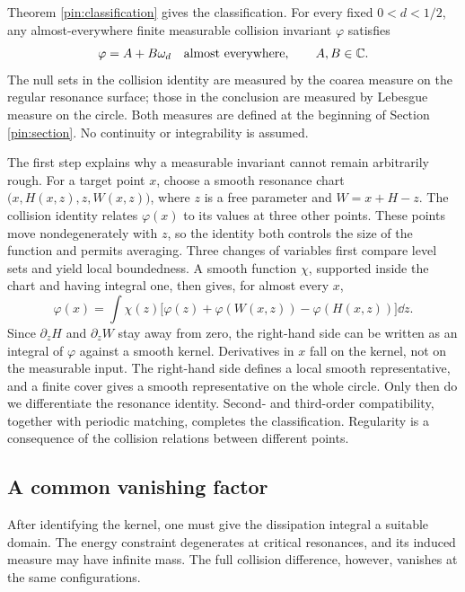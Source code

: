 Theorem \ref{pin:classification} gives the classification. For every fixed
$0<d<1/2$, any almost-everywhere finite measurable collision invariant
$\varphi$ satisfies
\begin{equation}\label{intro:classification}
 \varphi=A+B\omega_d\quad\text{almost everywhere},\qquad A,B\in\mathbb C.
\end{equation}
The null sets in the collision identity are measured by the coarea measure
on the regular resonance surface; those in the conclusion are measured by
Lebesgue measure on the circle. Both measures are defined at the beginning
of Section \ref{pin:section}. No continuity or integrability is assumed.

The first step explains why a measurable invariant cannot remain arbitrarily
rough. For a target point $x$, choose a smooth resonance chart
$\bigl(x,H(x,z),z,W(x,z)\bigr)$, where $z$ is a free parameter and
$W=x+H-z$. The collision identity relates $\varphi(x)$ to its values at
three other points. These points move nondegenerately with $z$, so the
identity both controls the size of the function and permits averaging.
Three changes of variables first compare level sets and yield local
boundedness. A smooth function $\chi$, supported inside the chart and
having integral one, then gives, for almost every $x$,
\begin{equation}\label{intro:resonant-average}
 \varphi(x)=\int\chi(z)
 \bigl[\varphi(z)+\varphi(W(x,z))-\varphi(H(x,z))\bigr]\dd z.
\end{equation}
Since $\partial_zH$ and $\partial_zW$ stay away from zero, the right-hand side
can be written as an integral of $\varphi$ against a smooth kernel.
Derivatives in $x$ fall on the kernel, not on the measurable input.
The right-hand side defines a local smooth representative, and a finite
cover gives a smooth representative on the whole circle. Only then do we
differentiate the resonance identity. Second- and third-order compatibility,
together with periodic matching, completes the classification.
Regularity is a consequence of the collision relations between different
points.

\subsection{A common vanishing factor}\label{intro:shared-factor}

After identifying the kernel, one must give the dissipation integral a
suitable domain. The energy constraint degenerates at critical resonances,
and its induced measure may have infinite mass. The full collision
difference, however, vanishes at the same configurations.

